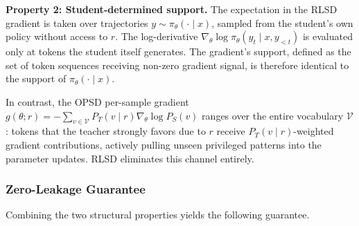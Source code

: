 \documentclass[]{jingdong}
\begin{document}
\noindent \textbf{Property 2: Student-determined support.}
The expectation in the RLSD gradient is taken over trajectories $y \sim \pi_\theta(\cdot \mid x)$, sampled from the student's own policy without access to $r$. The log-derivative $\nabla_\theta \log \pi_\theta(y_t \mid x, y_{<t})$ is evaluated only at tokens the student itself generates. The gradient's support, defined as the set of token sequences receiving non-zero gradient signal, is therefore identical to the support of $\pi_\theta(\cdot \mid x)$.

In contrast, the OPSD per-sample gradient $g(\theta; r) = -\sum_{v \in \mathcal{V}} P_T(v \mid r) \nabla_\theta \log P_S(v)$ ranges over the entire vocabulary $\mathcal{V}$: tokens that the teacher strongly favors due to $r$ receive $P_T(v \mid r)$-weighted gradient contributions, actively pulling unseen privileged patterns into the parameter updates. RLSD eliminates this channel entirely.


\subsubsection{Zero-Leakage Guarantee}

Combining the two structural properties yields the following guarantee.
\end{document}

